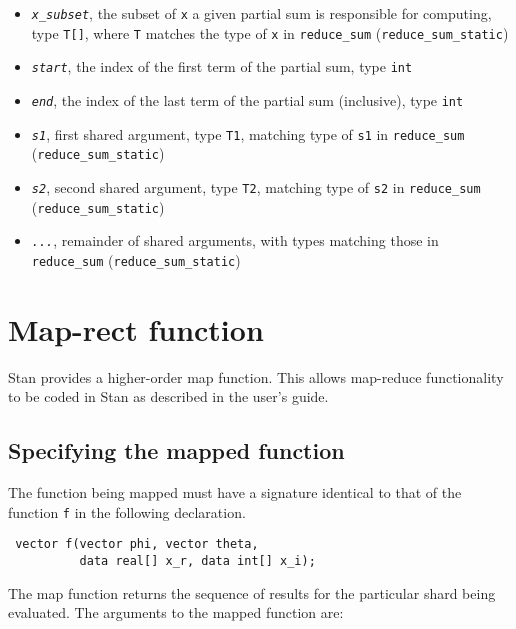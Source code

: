 \documentclass[
  10pt,
]{book}
\begin{document}
\begin{itemize}
\item
  \emph{\texttt{x\_subset}}, the subset of \texttt{x} a given partial sum is responsible for computing, type \texttt{T{[}{]}}, where \texttt{T} matches the type of \texttt{x} in \texttt{reduce\_sum} (\texttt{reduce\_sum\_static})
\item
  \emph{\texttt{start}}, the index of the first term of the partial sum, type \texttt{int}
\item
  \emph{\texttt{end}}, the index of the last term of the partial sum (inclusive), type \texttt{int}
\item
  \emph{\texttt{s1}}, first shared argument, type \texttt{T1}, matching type of \texttt{s1} in \texttt{reduce\_sum} (\texttt{reduce\_sum\_static})
\item
  \emph{\texttt{s2}}, second shared argument, type \texttt{T2}, matching type of \texttt{s2} in \texttt{reduce\_sum} (\texttt{reduce\_sum\_static})
\item
  \emph{\texttt{...}}, remainder of shared arguments, with types matching those in \texttt{reduce\_sum} (\texttt{reduce\_sum\_static})
\end{itemize}

\hypertarget{functions-map}{%
\section{Map-rect function}\label{functions-map}}

Stan provides a higher-order map function. This allows map-reduce
functionality to be coded in Stan as described in the user's guide.

\hypertarget{specifying-the-mapped-function}{%
\subsection{Specifying the mapped function}\label{specifying-the-mapped-function}}

The function being mapped must have a signature identical to that of
the function \texttt{f} in the following declaration.

\begin{verbatim}
 vector f(vector phi, vector theta,
          data real[] x_r, data int[] x_i);
\end{verbatim}

The map function returns the sequence of results for the particular
shard being evaluated. The arguments to the mapped function are:
\end{document}
